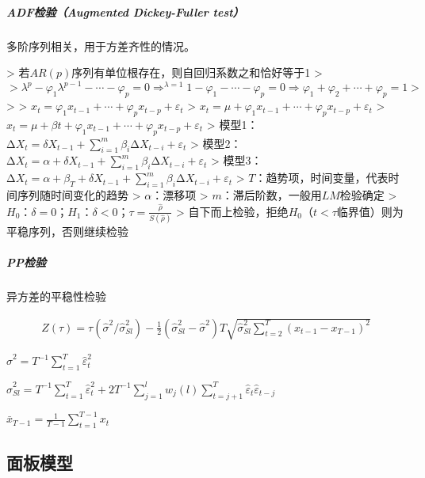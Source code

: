 \documentclass[12pt]{book}
\begin{document}
\subparagraph{ADF检验（Augmented Dickey-Fuller test）}

多阶序列相关，用于方差齐性的情况。

> 若$AR(p)$序列有单位根存在，则自回归系数之和恰好等于1  
> $$
> \lambda^p-\varphi_1\lambda^{p-1}-\cdots-\varphi_p=0 \Rightarrow^{\lambda=1} 1-\varphi_1-\cdots-\varphi_p=0 \Rightarrow\varphi_1+\varphi_2+\cdots+\varphi_p=1
> $$
> 
> $x_t=\varphi_{1}x_{t-1}+\cdots+\varphi_{p}x_{t-p}+\varepsilon_t$  
> $x_t=\mu+\varphi_{1}x_{t-1}+\cdots+\varphi_{p}x_{t-p}+\varepsilon_t$  
> $x_t=\mu+\beta t+\varphi_{1}x_{t-1}+\cdots+\varphi_{p}x_{t-p}+\varepsilon_t$  
> 模型1：$∆X_t=δX_{t-1}+\sum_{i=1}^{m}β_i∆X_{t-i}+ε_t$  
> 模型2：$∆X_t=α+δX_{t-1}+\sum_{i=1}^{m}β_i∆X_{t-i}+ε_{t}$  
> 模型3：$∆X_t=α+β_T+δX_{t-1}+\sum_{i=1}^{m}β_i∆X_{t-i}+ε_{t}$  
> $T$：趋势项，时间变量，代表时间序列随时间变化的趋势  
> $\alpha$：漂移项   
> $m$：滞后阶数，一般用$LM$检验确定  
> $H_0：δ=0；H_1：δ<0$；$\tau=\frac{\hat{\rho}}{S(\hat{\rho})}$  
> 自下而上检验，拒绝$H_0$（$t<\tau$临界值）则为平稳序列，否则继续检验

\subparagraph{PP检验}

异方差的平稳性检验

\begin{gather*}
    Z\left(\tau\right) =\tau(\hat{\sigma}^2/\hat{\sigma}_{Sl}^2 ) -\frac{1}{2}  (\hat{\sigma}_{Sl}^2-\hat{\sigma}^2) T \sqrt{\hat{\sigma}_{Sl}^2 \sum_{t=2}^{T}{(x_{t-1}-x_{T-1})^2}} 
\end{gather*}
\par ${\hat{\sigma}}^2=T^{-1}\sum_{t=1}^{T}{\hat{\varepsilon}}_t^2$  
\par ${\hat{\sigma}}_{Sl}^2=T^{-1}\sum_{t=1}^{T}{\hat{\varepsilon}}_t^2+2T^{-1}\sum_{j=1}^{l}{w_j(l)\sum_{t=j+1}^{T}{{\hat{\varepsilon}}_t{\hat{\varepsilon}}_{t-j}}}$  
\par $\bar{x}_{T-1}=\frac{1}{T-1}\sum_{t=1}^{T-1}{x_t}$











\subsection{面板模型}


\end{document}
